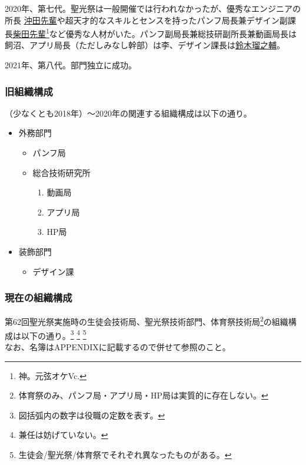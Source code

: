 \documentclass[dvipdfmx,jb5]{jarticle}
\newcommand{\mail}[2]{\href{mailto:#2}{#1}}
\begin{document}
2020年、第七代。聖光祭は一般開催では行われなかったが、優秀なエンジニアの所長 \mail{沖田先輩}{59039okita@seiko.ac.jp}や超天才的なスキルとセンスを持ったパンフ局長兼デザイン副課長\mail{柴田先輩}{59091shibataseiko.ac.jp}\footnote{神。元弦オケVc.}など優秀な人材がいた。パンフ副局長兼総技研副所長兼動画局長は飼沼、アプリ局長（ただしみなし幹部）は李、デザイン課長は\mail{鈴木瑠之輔}{60111suzuki@seiko.ac.jp}。

2021年、第八代。部門独立に成功。

\subsubsection{旧組織構成}
（少なくとも2018年）〜2020年の関連する組織構成は以下の通り。
\begin{itemize}
\item 外務部門
  \begin{itemize}
  \item パンフ局
  \item 総合技術研究所
    \begin{enumerate}[−]
    \item 動画局
    \item アプリ局
    \item HP局
    \end{enumerate}
  \end{itemize}
\item 装飾部門
  \begin{itemize}
  \item デザイン課
  \end{itemize}
\end{itemize}

\subsubsection{現在の組織構成}
第62回聖光祭実施時の生徒会技術局、聖光祭技術部門、体育祭技術局\footnote{体育祭のみ、パンフ局・アプリ局・HP局は実質的に存在しない。}の組織構成は以下の通り。\footnote{図括弧内の数字は役職の定数を表す。} \footnote{兼任は妨げていない。} \footnote{生徒会/聖光祭/体育祭でそれぞれ異なったものがある。}\\
なお、名簿はAPPENDIXに記載するので併せて参照のこと。
\end{document}
